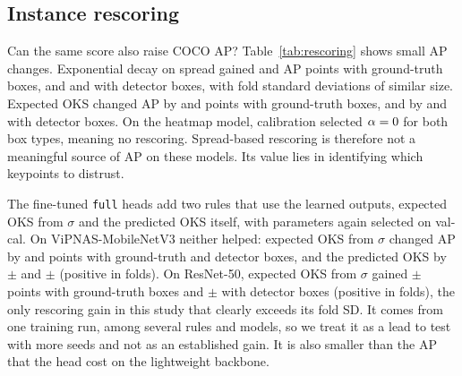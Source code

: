 \documentclass[preprint,11pt]{elsarticle}
\begin{document}
\subsection{Instance rescoring}

Can the same score also raise COCO AP? Table~\ref{tab:rescoring} shows small AP changes. Exponential decay on spread gained
\DapZsSimccMbvThreeExpAlphaDist{} and \DapZsSimccRFiveZeroExpAlphaDist{} AP points with ground-truth
boxes, and \DapZsSimccMbvThreeDetExpAlphaDist{} and \DapZsSimccRFiveZeroDetExpAlphaDist{} with detector
boxes, with fold standard deviations of similar size. Expected OKS changed AP by
\DapZsSimccMbvThreeEoksDist{} and \DapZsSimccRFiveZeroEoksDist{} points with ground-truth boxes, and
by \DapZsSimccMbvThreeDetEoksDist{} and \DapZsSimccRFiveZeroDetEoksDist{} with detector boxes. On the
heatmap model, calibration selected $\alpha=0$ for both box types, meaning no
rescoring. Spread-based rescoring is therefore not a
meaningful source of AP on these models. Its value lies in identifying which keypoints to distrust.

The fine-tuned \texttt{full} heads add two rules that use the learned outputs, expected OKS from
$\sigma$ and the predicted OKS itself, with parameters again selected on val-cal. On ViPNAS-MobileNetV3
neither helped: expected OKS from $\sigma$ changed AP by \DapFtMbvThreeFullSZeroEoksHet{} and
\DapFtMbvThreeFullSZeroDetEoksHet{} points with ground-truth and detector boxes, and the predicted OKS by
\DapFtMbvThreeFullSZeroPredOks{} $\pm$ \DapSdFtMbvThreeFullSZeroPredOks{} and
\DapFtMbvThreeFullSZeroDetPredOks{} $\pm$ \DapSdFtMbvThreeFullSZeroDetPredOks{} (positive in
\DapPosFtMbvThreeFullSZeroDetPredOks{} folds). On ResNet-50, expected OKS from $\sigma$ gained
\DapFtRFiveZeroFullSZeroEoksHet{} $\pm$ \DapSdFtRFiveZeroFullSZeroEoksHet{} points with ground-truth boxes
and \DapFtRFiveZeroFullSZeroDetEoksHet{} $\pm$ \DapSdFtRFiveZeroFullSZeroDetEoksHet{} with detector boxes
(positive in \DapPosFtRFiveZeroFullSZeroDetEoksHet{} folds), the only rescoring gain in this study that
clearly exceeds its fold SD. It comes from one training run, among several rules and models, so we treat
it as a lead to test with more seeds and not as an established gain. It is also smaller than the AP that
the head cost on the lightweight backbone.

\begin{table}[t]
\centering\scriptsize
\caption{Instance rescoring on the test split, with parameters selected on the calibration split, for
the pretrained SimCC models and the fine-tuned full heads (seed 0). All models use SimCC.
$\Delta$AP is in percentage points, paired over 10 folds. Test AP differs from
Table~\ref{tab:sanity} because it covers the test images only.}
\label{tab:rescoring}
\end{table}
\end{document}
